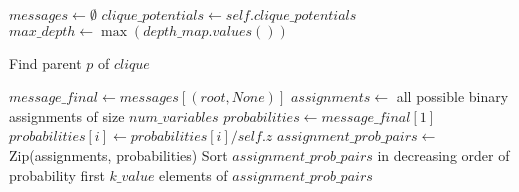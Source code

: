 \documentclass[a4paper,12pt]{article}
\begin{document}
\begin{algorithm}
\begin{algorithmic}[1]
\State $messages \gets \emptyset$
\State $clique\_potentials \gets self.clique\_potentials$
\State $max\_depth \gets \max(depth\_map.values())$

            \State Find parent $p$ of $clique$
                \State {}
            \EndFor
        \EndIf
    \EndFor
\EndFor

\State {}
\State $message\_final \gets messages[(root, None)]$
\State $assignments \gets$ all possible binary assignments of size $num\_variables$
\State $probabilities \gets message\_final[1]$
    \State $probabilities[i] \gets probabilities[i] / self.z$
\EndFor
\State $assignment\_prob\_pairs \gets$ Zip(assignments, probabilities)
\State Sort $assignment\_prob\_pairs$ in decreasing order of probability
\State \Return first $k\_value$ elements of $assignment\_prob\_pairs$
\EndProcedure
\end{algorithmic}
\end{algorithm}
    
\end{document}
